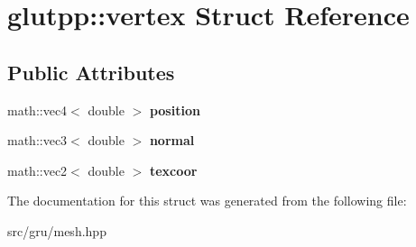 \hypertarget{structglutpp_1_1vertex}{\section{glutpp\-:\-:vertex \-Struct \-Reference}
\label{structglutpp_1_1vertex}
}
\subsection*{\-Public \-Attributes}
\begin{DoxyCompactItemize}
\item 
\hypertarget{structglutpp_1_1vertex_a096efb03a127a640af5c641950861646}{math\-::vec4$<$ double $>$ {\bfseries position}}\label{structglutpp_1_1vertex_a096efb03a127a640af5c641950861646}

\item 
\hypertarget{structglutpp_1_1vertex_a8ea4568ed3f49a290d3a05692f22f270}{math\-::vec3$<$ double $>$ {\bfseries normal}}\label{structglutpp_1_1vertex_a8ea4568ed3f49a290d3a05692f22f270}

\item 
\hypertarget{structglutpp_1_1vertex_a9f77072ac57348dff19d1aafe2c46d0b}{math\-::vec2$<$ double $>$ {\bfseries texcoor}}\label{structglutpp_1_1vertex_a9f77072ac57348dff19d1aafe2c46d0b}

\end{DoxyCompactItemize}


\-The documentation for this struct was generated from the following file\-:\begin{DoxyCompactItemize}
\item 
src/gru/mesh.\-hpp\end{DoxyCompactItemize}
